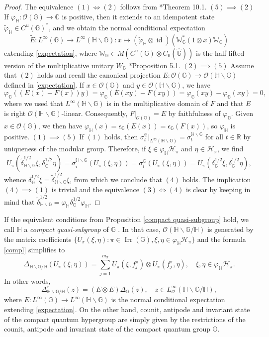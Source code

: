 \documentclass[reqno]{amsart}
\numberwithin{equation}{section}
\DeclareMathOperator{\id}{\mathrm{id}}
\DeclareMathOperator{\Irr}{\mathrm{Irr}}
\renewcommand{\H}{\mathbb{H}}
\newcommand{\mcH}{\mathcal{H}}
\newcommand{\mcO}{\mathcal{O}}
\newcommand{\Ww}{\mathds{W}}
\newcommand{\C}{\mathbb{C}}
\newcommand{\G}{\mathbb{G}}
\newcommand{\R}{\mathbb{R}}
\begin{document}
\begin{proof} The equivalence $(1)\iff (2)$ follows from \cite{St20}*{Theorem 10.1}. 
$(5)\implies (2)$ If $\varphi_\H: \mcO(\G)\to \C$ is positive, then it extends to an idempotent state $\tilde{\varphi}_\H\in C^u(\G)^*$, and we obtain the normal conditional expectation
$$\tilde{E}: L^\infty(\G)\to L^\infty(\H \backslash \G): x \mapsto (\tilde{\varphi}_\H\otimes \id)(\Ww_\G^*(1\otimes x)\Ww_\G)$$
extending \eqref{expectation}, where $\Ww_\G\in M(C^u(\G)\otimes C_0(\hat{\G}))$ is the half-lifted version of the multiplicative unitary $W_\G$ \cite{Kus01}*{Proposition 5.1}. $(2)\implies (5)$ Assume that $(2)$ holds and recall the canonical projection $E: \mcO(\G)\to \mcO(\H\backslash \G)$ defined in \eqref{expectation}. If $x\in \mcO(\G)$ and $y \in \mcO(\H\backslash \G)$, we have
$$\varphi_\G((E(x)-F(x))y) = \varphi_\G(E(xy)-F(xy)) = \varphi_\G(xy)- \varphi_\G(xy) = 0,$$
where we used that $L^\infty(\H\backslash \G)$ is in the multiplicative domain of $F$ and that $E$ is right $\mcO(\H\backslash \G)$-linear.
Consequently, $F\vert_{\mcO(\G)}= E$ by faithfulness of $\varphi_\G$. Given $x\in \mcO(\G)$, we then have $\varphi_\H(x) = \epsilon_\G(E(x))= \epsilon_\G (F(x))$,
so $\varphi_\H$ is positive. $(1)\implies (5)$ If $(1)$ holds, then $\sigma_t^{\G}\vert_{L^\infty(\H\backslash \G)}= \sigma_t^{\H\backslash \G}$ for all $t\in \R$ by uniqueness of the modular group. Therefore, if $\xi \in \varphi_\H \mcH_\pi$ and $\eta \in \mcH_\pi$, we find
$$U_\pi(\tilde{\delta}_{\H\backslash \G}^{1/2}\xi, \delta_\G^{1/2}\eta)=\sigma_{i}^{\H\backslash \G}(U_\pi(\xi, \eta)) = \sigma_{i}^{\G}(U_\pi(\xi, \eta))= U_\pi(\delta_\G^{1/2}\xi, \delta_\G^{1/2}\eta),$$
whence $\delta_\G^{1/2}\xi = \tilde{\delta}_{\H\backslash \G}^{1/2}\xi$, from which we conclude that $(4)$ holds. The implication $(4)\implies (1)$ is trivial and the equivalence $(3)\iff (4)$ is clear by keeping in mind that $\tilde{\delta}_{\H\backslash \G}^{1/2}= \varphi_\H \delta_\G^{1/2}\varphi_\H$.
\end{proof}

If the equivalent conditions from Proposition \ref{compact quasi-subgroup} hold, we call $\H$ a \emph{compact quasi-subgroup} of $\G$ \cite{KS20}. In that case, $\mcO(\H\backslash \G/\H)$ is generated by the matrix coefficients $\{U_\pi(\xi, \eta): \pi\in \Irr(\G), \xi, \eta \in \varphi_\H \mcH_\pi\}$ and the formula \eqref{compl} simplifies to
$$\Delta_{\H\backslash \G/\H}(U_\pi(\xi, \eta))= \sum_{j=1}^{m_\pi} U_\pi(\xi, f_j^\pi)\otimes U_\pi(f_j^\pi, \eta), \quad \xi, \eta \in \varphi_\H \mcH_\pi.$$
In other words,
$$\Delta_{\H\backslash \G/\H}^r(z)= (E\otimes E) \Delta_\G(z), \quad z \in L^\infty_\mcO(\H \backslash \G/\H),$$
where $E: L^\infty(\G)\to L^\infty(\H\backslash \G)$ is the normal conditional expectation extending \eqref{expectation}.
On the other hand, counit, antipode and invariant state of the compact quantum hypergroup are simply given by the restrictions of the counit, antipode and invariant state of the compact quantum group $\G$.
\end{document}

